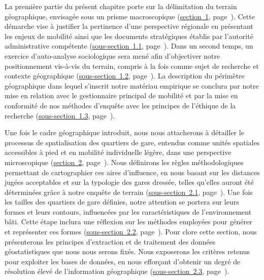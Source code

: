 \begin{refsegment}
La première partie du présent chapitre porte sur la délimitation du terrain géographique, envisagée sous un prisme macroscopique (\hyperref[chap3:region-hauts-de-france]{section~1}, page~\pageref{chap3:region-hauts-de-france}). Cette démarche vise à justifier la pertinence d’une perspective régionale en présentant les enjeux de mobilité ainsi que les documents stratégiques établis par l’autorité administrative compétente (\hyperref[chap3:regard-privilegie-region-hdf]{sous-section~1.1}, page~\pageref{chap3:regard-privilegie-region-hdf}). Dans un second temps, un exercice d’auto-analyse sociologique sera mené afin d’objectiver notre positionnement vis-à-vis du terrain, compris à la fois comme sujet de recherche et contexte géographique (\hyperref[chap3:auto-analyse-sociologique]{sous-section~1.2}, page~\pageref{chap3:auto-analyse-sociologique}). La description du périmètre géographique dans lequel s’inscrit notre matériau empirique se conclura par notre mise en relation avec le gestionnaire principal de mobilité et par la mise en conformité de nos méthodes d’enquête avec les principes de l’éthique de la recherche (\hyperref[chap3:preparation-terrain-geographique]{sous-section~1.3}, page~\pageref{chap3:preparation-terrain-geographique}).%

Une fois le cadre géographique introduit, nous nous attacherons à détailler le processus de spatialisation des quartiers de gare, entendus comme unités spatiales accessibles à pied et en mobilité individuelle légère, dans une perspective microscopique (\hyperref[chap3:quartiers-gare]{section~2}, page~\pageref{chap3:quartiers-gare}). Nous définirons les règles méthodologiques permettant de cartographier ces aires d’influence, en nous basant sur les distances jugées acceptables et sur la typologie des gares dressée, telles qu’elles auront été déterminées grâce à notre enquête de terrain (\hyperref[chap3:quartiers-gare-distances]{sous-section~2.1}, page~\pageref{chap3:quartiers-gare-distances}). Une fois les tailles des quartiers de gare définies, notre attention se portera sur leurs formes et leurs contours, influencées par les caractéristiques de l’environnement bâti. Cette étape inclura une réflexion sur les méthodes employées pour générer et représenter ces formes (\hyperref[chap3:quartiers-gare-formes]{sous-section~2.2}, page~\pageref{chap3:quartiers-gare-formes}). Pour clore cette section, nous présenterons les principes d’extraction et de traitement des données géostatistiques que nous nous serons fixés. Nous exposerons les critères retenus pour exploiter les bases de données, en nous efforçant d'obtenir un degré de résolution élevé de l'information géographique (\hyperref[chap3:quartiers-gare-analyse-geostatistique]{sous-section~2.3}, page~\pageref{chap3:quartiers-gare-analyse-geostatistique}).%


\end{refsegment}
